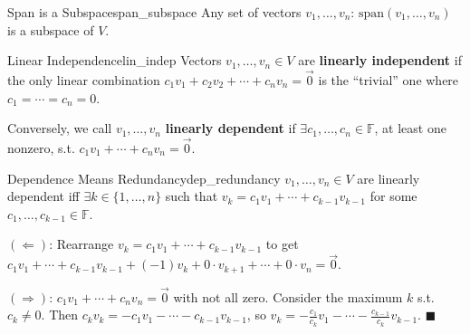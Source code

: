 \documentclass[11pt, letterpaper, openany]{book}
\renewenvironment{proof}[1][\proofname]{%
  \tcolorbox[blanker, breakable, left=1em,
    before skip=1em, after skip=1em,
    borderline west={2pt}{0pt}{MagicTeal!50},
    colback=MagicCream,
    before upper={\textcolor{MagicTeal}{\sffamily\bfseries #1.}\space}
  ]%
}{%
  \hfill\textcolor{MagicTeal}{\ensuremath{\blacksquare}}\endtcolorbox%
}
\begin{document}
\begin{lem}{Span is a Subspace}{span_subspace}
Any set of vectors $v_1, \ldots, v_n$: $\text{span}(v_1, \ldots, v_n)$ is a subspace of $V$.
\end{lem}

\begin{defn}{Linear Independence}{lin_indep}
Vectors $v_1, \ldots, v_n \in V$ are \textbf{linearly independent} if the only linear combination $c_1 v_1 + c_2 v_2 + \cdots + c_n v_n = \vec{0}$ is the ``trivial'' one where $c_1 = \cdots = c_n = 0$.

Conversely, we call $v_1, \ldots, v_n$ \textbf{linearly dependent} if $\exists c_1, \ldots, c_n \in \mathbb{F}$, at least one nonzero, s.t. $c_1 v_1 + \cdots + c_n v_n = \vec{0}$.
\end{defn}

\begin{lem}{Dependence Means Redundancy}{dep_redundancy}
$v_1, \ldots, v_n \in V$ are linearly dependent iff $\exists k \in \{1, \ldots, n\}$ such that $v_k = c_1 v_1 + \cdots + c_{k-1} v_{k-1}$ for some $c_1, \ldots, c_{k-1} \in \mathbb{F}$.
\end{lem}

\begin{proof}
$(\Leftarrow)$: Rearrange $v_k = c_1 v_1 + \cdots + c_{k-1} v_{k-1}$ to get $c_1 v_1 + \cdots + c_{k-1} v_{k-1} + (-1) v_k + 0 \cdot v_{k+1} + \cdots + 0 \cdot v_n = \vec{0}$.

$(\Rightarrow)$: $c_1 v_1 + \cdots + c_n v_n = \vec{0}$ with not all zero. Consider the maximum $k$ s.t. $c_k \neq 0$. Then $c_k v_k = -c_1 v_1 - \cdots - c_{k-1} v_{k-1}$, so $v_k = -\frac{c_1}{c_k} v_1 - \cdots - \frac{c_{k-1}}{c_k} v_{k-1}$.
\end{proof}
\end{document}
